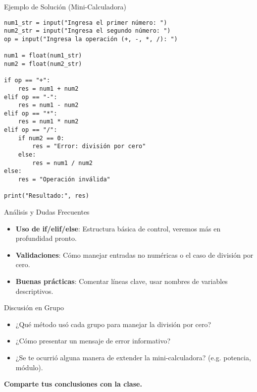 \documentclass[10pt]{beamer}
\begin{document}
\begin{frame}[fragile]{Ejemplo de Solución (Mini-Calculadora)}
\begin{verbatim}
num1_str = input("Ingresa el primer número: ")
num2_str = input("Ingresa el segundo número: ")
op = input("Ingresa la operación (+, -, *, /): ")

num1 = float(num1_str)
num2 = float(num2_str)

if op == "+":
    res = num1 + num2
elif op == "-":
    res = num1 - num2
elif op == "*":
    res = num1 * num2
elif op == "/":
    if num2 == 0:
        res = "Error: división por cero"
    else:
        res = num1 / num2
else:
    res = "Operación inválida"

print("Resultado:", res)
\end{verbatim}
\end{frame}

\begin{frame}{Análisis y Dudas Frecuentes}
  \begin{itemize}
    \item \textbf{Uso de if/elif/else}: Estructura básica de control, veremos más en profundidad pronto.
    \item \textbf{Validaciones}: Cómo manejar entradas no numéricas o el caso de división por cero.
    \item \textbf{Buenas prácticas}: Comentar líneas clave, usar nombres de variables descriptivos.
  \end{itemize}
\end{frame}

\begin{frame}{Discusión en Grupo}
  \begin{itemize}
    \item ¿Qué método usó cada grupo para manejar la división por cero?
    \item ¿Cómo presentar un mensaje de error informativo?
    \item ¿Se te ocurrió alguna manera de extender la mini-calculadora? (e.g. potencia, módulo).
  \end{itemize}
  \vspace{0.2cm}
  \textbf{Comparte tus conclusiones con la clase.}
\end{frame}
\end{document}
